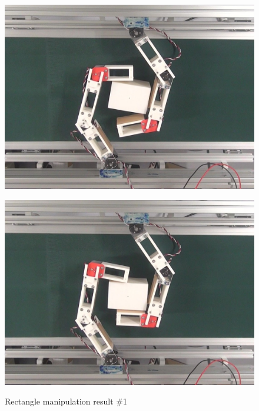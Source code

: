 \documentclass[a4paper,twoside,12pt,papersize, dvipdfmx]{iirthesis}
\begin{document}
\begin{figure}[hbt]
\begin{minipage}{0.249\hsize}
\includegraphics[width=0.98\hsize]{fig/4-manipulation-result/Rectangle/1-3.jpg}
\subcaption{}\label{}
\end{minipage}\hfill
\begin{minipage}{0.249\hsize}
\centering
\includegraphics[width=0.98\hsize]{fig/4-manipulation-result/Rectangle/1-4.jpg}
\subcaption{}\label{}
\end{minipage}
\caption{Rectangle manipulation result \#1}\label{fig::result::rm1}
\end{figure}
\end{document}
